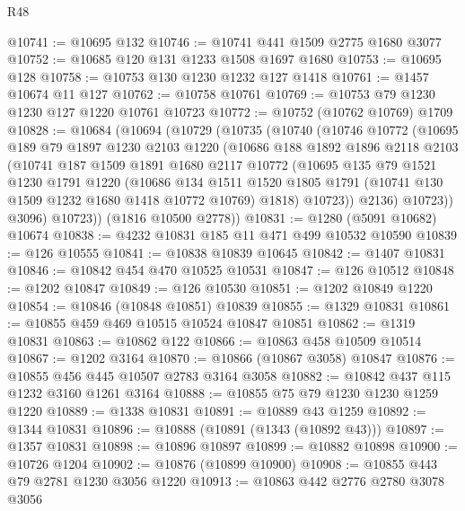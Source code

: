 \begin{lexlean}{R48}
\begin{coremodule}
@10741 := @10695 @132
@10746 := @10741 @441 @1509 @2775 @1680 @3077
@10752 := @10685 @120 @131 @1233 @1508 @1697 @1680
@10753 := @10695 @128
@10758 := @10753 @130 @1230 @1232 @127 @1418
@10761 := @1457 @10674 @11 @127
@10762 := @10758 @10761
@10769 := @10753 @79 @1230 @1230 @127 @1220 @10761 @10723
@10772 := @10752 (@10762 @10769) @1709
@10828 := @10684
    (@10694
      (@10729
        (@10735
          (@10740
            (@10746
              @10772
              (@10695
                @189
                @79
                @1897
                @1230
                @2103
                @1220
                (@10686
                  @188
                  @1892
                  @1896
                  @2118
                  @2103
                  (@10741
                    @187
                    @1509
                    @1891
                    @1680
                    @2117
                    @10772
                    (@10695
                      @135
                      @79
                      @1521
                      @1230
                      @1791
                      @1220
                      (@10686
                        @134
                        @1511
                        @1520
                        @1805
                        @1791
                        (@10741 @130 @1509 @1232 @1680 @1418 @10772 @10769)
                        @1818)
                      @10723))
                  @2136)
                @10723))
            @3096)
          @10723))
      (@1816 @10500 @2778))
@10831 := @1280 (@5091 @10682) @10674
@10838 := @4232 @10831 @185 @11 @471 @499 @10532 @10590
@10839 := @126 @10555
@10841 := @10838 @10839 @10645
@10842 := @1407 @10831
@10846 := @10842 @454 @470 @10525 @10531
@10847 := @126 @10512
@10848 := @1202 @10847
@10849 := @126 @10530
@10851 := @1202 @10849 @1220
@10854 := @10846 (@10848 @10851) @10839
@10855 := @1329 @10831
@10861 := @10855 @459 @469 @10515 @10524 @10847 @10851
@10862 := @1319 @10831
@10863 := @10862 @122
@10866 := @10863 @458 @10509 @10514
@10867 := @1202 @3164
@10870 := @10866 (@10867 @3058) @10847
@10876 := @10855 @456 @445 @10507 @2783 @3164 @3058
@10882 := @10842 @437 @115 @1232 @3160 @1261 @3164
@10888 := @10855 @75 @79 @1230 @1230 @1259 @1220
@10889 := @1338 @10831
@10891 := @10889 @43 @1259
@10892 := @1344 @10831
@10896 := @10888 (@10891 (@1343 (@10892 @43)))
@10897 := @1357 @10831
@10898 := @10896 @10897
@10899 := @10882 @10898
@10900 := @10726 @1204
@10902 := @10876 (@10899 @10900)
@10908 := @10855 @443 @79 @2781 @1230 @3056 @1220
@10913 := @10863 @442 @2776 @2780 @3078 @3056

\end{coremodule}
\end{lexlean}
